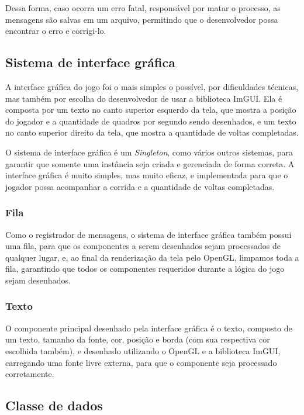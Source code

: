 Dessa forma, caso ocorra um erro fatal, responsável por matar o processo, as mensagens são salvas em um arquivo, permitindo que o desenvolvedor possa encontrar o erro e corrigi-lo.

\subsection{Sistema de interface gráfica}

A interface gráfica do jogo foi o mais simples o possível, por dificuldades técnicas, mas também por escolha do desenvolvedor de usar a biblioteca ImGUI. Ela é composta por um texto no canto superior esquerdo da tela, que mostra a posição do jogador e a quantidade de quadros por segundo sendo desenhados, e um texto no canto superior direito da tela, que mostra a quantidade de voltas completadas.

O sistema de interface gráfica é um \textit{Singleton}, como vários outros sistemas, para garantir que somente uma instância seja criada e gerenciada de forma correta. A interface gráfica é muito simples, mas muito eficaz, e implementada para que o jogador possa acompanhar a corrida e a quantidade de voltas completadas.

\subsubsection{Fila}
Como o registrador de mensagens, o sistema de interface gráfica também possui uma fila, para que os componentes a serem desenhados sejam processados de qualquer lugar, e, ao final da renderização da tela pelo OpenGL, limpamos toda a fila, garantindo que todos os componentes requeridos durante a lógica do jogo sejam desenhados.

\subsubsection{Texto}

O componente principal desenhado pela interface gráfica é o texto, composto de um texto, tamanho da fonte, cor, posição e borda (com sua respectiva cor escolhida também), e desenhado utilizando o OpenGL e a biblioteca ImGUI, carregando uma fonte livre externa, para que o componente seja processado corretamente.

\subsection{Classe de dados}

